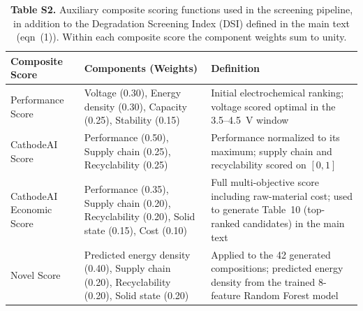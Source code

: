 \documentclass[10pt]{article}
\begin{document}
\begin{table}[htbp]
\centering
\caption{\textbf{Table S2.} Auxiliary composite scoring functions used in the
screening pipeline, in addition to the Degradation Screening Index (DSI)
defined in the main text (eqn~(1)). Within each composite score the component
weights sum to unity.}
\label{tab:s2_scores}
\setlength{\tabcolsep}{6pt}
\renewcommand{\arraystretch}{1.3}
\begin{tabular}{p{3.2cm} p{4.4cm} p{6.6cm}}
\hline
\textbf{Composite Score} & \textbf{Components (Weights)} & \textbf{Definition} \\
\hline
Performance Score &
Voltage (0.30), Energy density (0.30), Capacity (0.25), Stability (0.15) &
Initial electrochemical ranking; voltage scored optimal in the 3.5--4.5~V
window \\[4pt]
CathodeAI Score &
Performance (0.50), Supply chain (0.25), Recyclability (0.25) &
Performance normalized to its maximum; supply chain and recyclability scored
on $[0,1]$ \\[4pt]
CathodeAI Economic Score &
Performance (0.35), Supply chain (0.20), Recyclability (0.20), Solid state
(0.15), Cost (0.10) &
Full multi-objective score including raw-material cost; used to generate
Table~10 (top-ranked candidates) in the main text \\[4pt]
Novel Score &
Predicted energy density (0.40), Supply chain (0.20), Recyclability (0.20),
Solid state (0.20) &
Applied to the 42 generated compositions; predicted energy density from the
trained 8-feature Random Forest model \\
\hline
\end{tabular}
\end{table}
\end{document}
